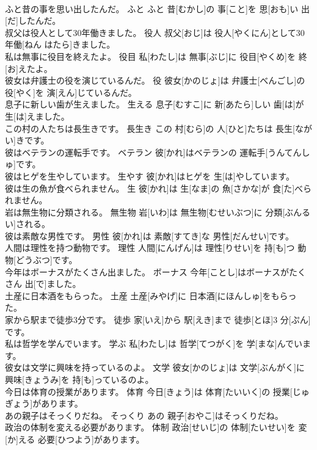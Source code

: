 \documentclass[8pt]{extreport}
\begin{document}
\begin{CJK}{UTF8}{min}
\\	ふと昔の事を思い出したんだ。	ふと	ふと 昔[むかし]の 事[こと]を 思[おも]い 出[だ]したんだ。	
\\	叔父は役人として30年働きました。	役人	叔父[おじ]は 役人[やくにん]として30 年働[ねん はたら]きました。	
\\	私は無事に役目を終えたよ。	役目	私[わたし]は 無事[ぶじ]に 役目[やくめ]を 終[お]えたよ。	
\\	彼女は弁護士の役を演じているんだ。	役	彼女[かのじょ]は 弁護士[べんごし]の 役[やく]を 演[えん]じているんだ。	
\\	息子に新しい歯が生えました。	生える	息子[むすこ]に 新[あたら]しい 歯[は]が 生[は]えました。	
\\	この村の人たちは長生きです。	長生き	この 村[むら]の 人[ひと]たちは 長生[ながい]きです。	
\\	彼はベテランの運転手です。	ベテラン	彼[かれ]はベテランの 運転手[うんてんしゅ]です。	
\\	彼はヒゲを生やしています。	生やす	彼[かれ]はヒゲを 生[は]やしています。	
\\	彼は生の魚が食べられません。	生	彼[かれ]は 生[なま]の 魚[さかな]が 食[た]べられません。	
\\	岩は無生物に分類される。	無生物	岩[いわ]は 無生物[むせいぶつ]に 分類[ぶんるい]される。	
\\	彼は素敵な男性です。	男性	彼[かれ]は 素敵[すてき]な 男性[だんせい]です。	
\\	人間は理性を持つ動物です。	理性	人間[にんげん]は 理性[りせい]を 持[も]つ 動物[どうぶつ]です。	
\\	今年はボーナスがたくさん出ました。	ボーナス	今年[ことし]はボーナスがたくさん 出[で]ました。	
\\	土産に日本酒をもらった。	土産	土産[みやげ]に 日本酒[にほんしゅ]をもらった。	
\\	家から駅まで徒歩3分です。	徒歩	家[いえ]から 駅[えき]まで 徒歩[とほ]3 分[ぷん]です。	
\\	私は哲学を学んでいます。	学ぶ	私[わたし]は 哲学[てつがく]を 学[まな]んでいます。	
\\	彼女は文学に興味を持っているのよ。	文学	彼女[かのじょ]は 文学[ぶんがく]に 興味[きょうみ]を 持[も]っているのよ。	
\\	今日は体育の授業があります。	体育	今日[きょう]は 体育[たいいく]の 授業[じゅぎょう]があります。	
\\	あの親子はそっくりだね。	そっくり	あの 親子[おやこ]はそっくりだね。	
\\	政治の体制を変える必要があります。	体制	政治[せいじ]の 体制[たいせい]を 変[か]える 必要[ひつよう]があります。	

\end{CJK}
\end{document}
